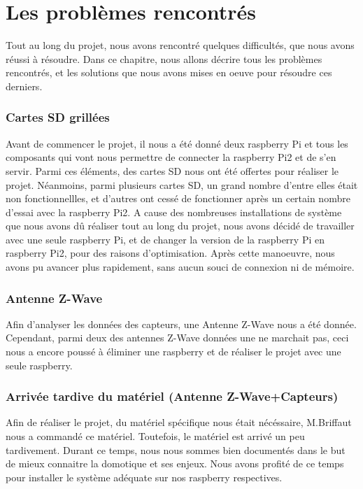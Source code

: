 
\clearpage
\newpage

\clearpage
\newpage
\chapter{Les problèmes rencontrés}
Tout au long du projet, nous avons rencontré quelques difficultés, que nous avons réussi à résoudre. Dans ce chapitre, nous allons décrire tous les problèmes rencontrés, et les solutions que nous avons mises en oeuve pour résoudre ces derniers.
\subsection{Cartes SD grillées }
Avant de commencer le projet, il nous a été donné deux raspberry Pi et tous les composants qui vont nous permettre de connecter la raspberry Pi2 et de s'en servir.\newline
Parmi ces éléments, des cartes SD nous ont été offertes pour réaliser le projet. Néanmoins, parmi plusieurs cartes SD, un grand nombre d'entre elles était non fonctionnellles, et d'autres ont cessé de fonctionner après un certain nombre d'essai avec la raspberry Pi2.\newline
A cause des nombreuses installations de système que nous avons dû réaliser tout au long du projet, nous avons décidé de travailler avec une seule raspberry Pi, et de changer la version de la raspberry Pi en raspberry Pi2, pour des raisons d'optimisation. Après cette manoeuvre, nous avons pu avancer plus rapidement, sans aucun souci de connexion ni de mémoire.
\subsection{Antenne Z-Wave}
Afin d'analyser les données des capteurs, une Antenne Z-Wave nous a été donnée. Cependant, parmi deux des antennes Z-Wave données une ne marchait pas, ceci nous a encore poussé à éliminer une raspberry et de réaliser le projet avec une seule raspberry.
\subsection{Arrivée tardive du matériel (Antenne Z-Wave+Capteurs)}
Afin de réaliser le projet, du matériel spécifique nous était nécéssaire, M.Briffaut nous a commandé ce matériel.
Toutefois, le matériel est arrivé un peu tardivement. Durant ce temps, nous nous sommes bien documentés dans le but de mieux connaitre la domotique et ses enjeux. Nous avons profité de ce temps pour installer le système adéquate sur nos raspberry respectives.   

